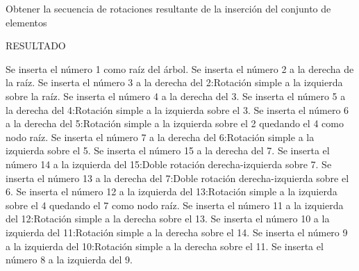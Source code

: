 Obtener la secuencia de rotaciones resultante de la inserción del conjunto de elementos

RESULTADO

    Se inserta el número 1 como raíz del árbol.
    Se inserta el número 2 a la derecha de la raíz.
    Se inserta el número 3 a la derecha del 2:Rotación simple a la izquierda sobre la raíz.
    Se inserta el número 4 a la derecha del 3.
    Se inserta el número 5 a la derecha del 4:Rotación simple a la izquierda sobre el 3.
    Se inserta el número 6 a la derecha del 5:Rotación simple a la izquierda sobre el 2 quedando el 4 como nodo raíz.
    Se inserta el número 7 a la derecha del 6:Rotación simple a la izquierda sobre el 5.
    Se inserta el número 15 a la derecha del 7.
    Se inserta el número 14 a la izquierda del 15:Doble rotación derecha-izquierda sobre 7.
    Se inserta el número 13 a la derecha del 7:Doble rotación derecha-izquierda sobre el 6.
    Se inserta el número 12 a la izquierda del 13:Rotación simple a la izquierda sobre el 4 quedando el 7 como nodo raíz.
    Se inserta el número 11 a la izquierda del 12:Rotación simple a la derecha sobre el 13.
    Se inserta el número 10 a la izquierda del 11:Rotación simple a la derecha sobre el 14.
    Se inserta el número 9 a la izquierda del 10:Rotación simple a la derecha sobre el 11.
    Se inserta el número 8 a la izquierda del 9.
